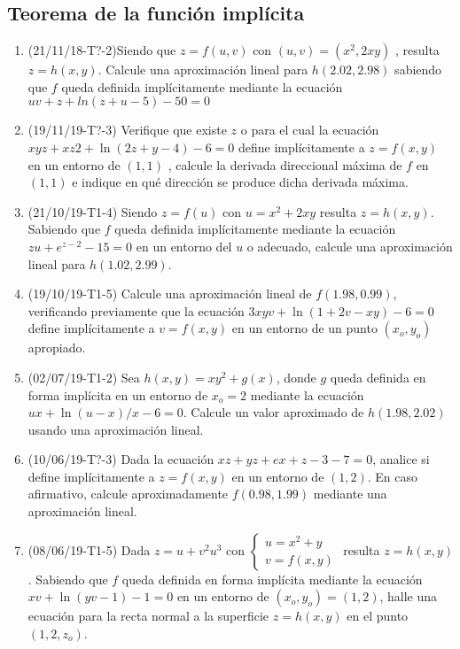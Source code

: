\documentclass[12pt,a4paper]{article}
\begin{document}
\subsection{Teorema de la función implícita}
\begin{enumerate}
	\item (21/11/18-T?-2)Siendo que $ z = f ( u , v ) $ con $ ( u , v ) = ( x^2 , 2 x y ) $ , resulta $ z = h ( x , y )  $. Calcule una aproximación lineal para $ h ( 2 . 02 , 2 . 98 ) $ sabiendo que $ f $ queda definida implícitamente mediante la ecuación $ u v + z + ln( z + u - 5 ) - 50 = 0 $
	
	\item (19/11/19-T?-3) Verifique que existe $ z $ o para el cual la ecuación $ x y z + x z 2 + \ln( 2 z + y - 4 ) - 6 = 0 $ define implícitamente a $ z = f ( x , y ) $ en un entorno de $ ( 1 , 1 ) $ , calcule la derivada direccional máxima de $ f $ en $ ( 1 , 1 ) $	e indique en qué dirección se produce dicha derivada máxima.
	
	\item (21/10/19-T1-4) Siendo $z = f (u )$ con $u = x^2 + 2 x y$ resulta $z = h ( x , y ) $. Sabiendo que $f$ queda definida implícitamente mediante la ecuación $z u + e^{z-2}-15 = 0$ en un entorno del $u$ o adecuado, calcule una aproximación lineal para $ h ( 1 . 02 , 2 . 99 )  $.
	
	\item (19/10/19-T1-5) Calcule una aproximación lineal de $f ( 1 . 98 , 0 . 99 )$, verificando previamente que la ecuación	$3 x y v + \ln( 1 + 2 v - x y ) - 6 = 0$ define implícitamente a $v = f ( x , y )$ en un entorno de un punto $( x_o , y_o )$ apropiado.
	
	\item (02/07/19-T1-2) Sea $ h ( x , y ) = x y^2 + g ( x )  $, donde $g$ queda definida en forma implícita en un entorno de $x_o = 2$ mediante la ecuación $u x + \ln( u - x ) / x - 6 = 0 $. Calcule un valor aproximado de $h ( 1 . 98 , 2 . 02 )$ usando una aproximación lineal.
	
	\item (10/06/19-T?-3) Dada la ecuación $x z + y z + e x +z - 3 - 7 = 0$, analice si define implícitamente a $z = f ( x , y )$ en un entorno de $( 1 , 2 )$. En caso afirmativo, calcule aproximadamente $f ( 0 . 98 , 1 . 99 )$ mediante una aproximación lineal.
	
	\item (08/06/19-T1-5) Dada $z = u + v^2 u^3$ con $\begin{cases}
	u=x^2+y \\
	v=f(x,y)
	\end{cases}$ resulta $z = h ( x , y ) $. Sabiendo que $f$ queda definida en forma implícita mediante la ecuación $x v + \ln( y v - 1 ) - 1 = 0$ en un entorno de $( x_o , y_o ) = ( 1 , 2 ) $, halle una ecuación para la recta normal a la superficie $z = h ( x , y )$ en el punto $( 1 , 2 , z_o ) $.
	

\end{enumerate}
\end{document}
